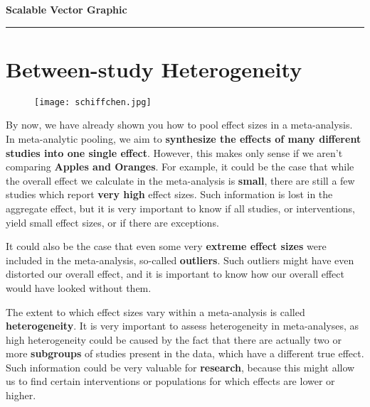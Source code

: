 \documentclass[]{book}
\newenvironment{Shaded}{\begin{snugshade}}{\end{snugshade}}
\newcommand{\KeywordTok}[1]{\textcolor[rgb]{0.13,0.29,0.53}{\textbf{#1}}}
\newcommand{\DataTypeTok}[1]{\textcolor[rgb]{0.13,0.29,0.53}{#1}}
\newcommand{\DecValTok}[1]{\textcolor[rgb]{0.00,0.00,0.81}{#1}}
\newcommand{\StringTok}[1]{\textcolor[rgb]{0.31,0.60,0.02}{#1}}
\newcommand{\NormalTok}[1]{#1}
\theoremstyle{definition}
\theoremstyle{definition}
\theoremstyle{definition}
\theoremstyle{remark}
\begin{document}
\textbf{Scalable Vector Graphic}

\begin{Shaded}
\end{Shaded}

\begin{center}\rule{0.5\linewidth}{\linethickness}\end{center}

\hypertarget{heterogeneity}{\chapter{Between-study
Heterogeneity}\label{heterogeneity}}

\begin{figure}
\centering
\texttt{[image: schiffchen.jpg]}
\caption{}
\end{figure}

By now, we have already shown you how to pool effect sizes in a
meta-analysis. In meta-analytic pooling, we aim to \textbf{synthesize
the effects of many different studies into one single effect}. However,
this makes only sense if we aren't comparing \textbf{Apples and
Oranges}. For example, it could be the case that while the overall
effect we calculate in the meta-analysis is \textbf{small}, there are
still a few studies which report \textbf{very high} effect sizes. Such
information is lost in the aggregate effect, but it is very important to
know if all studies, or interventions, yield small effect sizes, or if
there are exceptions.

It could also be the case that even some very \textbf{extreme effect
sizes} were included in the meta-analysis, so-called \textbf{outliers}.
Such outliers might have even distorted our overall effect, and it is
important to know how our overall effect would have looked without them.

The extent to which effect sizes vary within a meta-analysis is called
\textbf{heterogeneity}. It is very important to assess heterogeneity in
meta-analyses, as high heterogeneity could be caused by the fact that
there are actually two or more \textbf{subgroups} of studies present in
the data, which have a different true effect. Such information could be
very valuable for \textbf{research}, because this might allow us to find
certain interventions or populations for which effects are lower or
higher.
\end{document}
